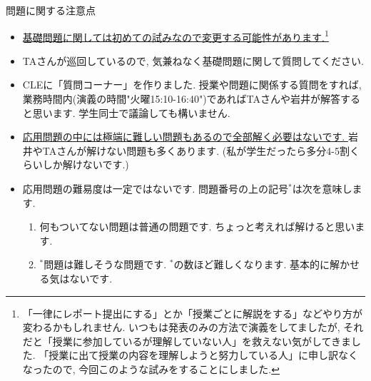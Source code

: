 \documentclass[dvipdfmx,a4paper,11pt]{article}
\theoremstyle{definition}
\begin{document}
\hspace{-18pt}問題に関する注意点
\begin{itemize}
  \setlength{\parskip}{0cm} 
  \setlength{\itemsep}{0cm} 
  \item \underline{基礎問題に関しては初めての試みなので変更する可能性があります.}\footnote{ 「一律にレポート提出にする」とか「授業ごとに解説をする」などやり方が変わるかもしれません. いつもは発表のみの方法で演義をしてましたが, それだと「授業に参加しているが理解していない人」を救えない気がしてきました. 「授業に出て授業の内容を理解しようと努力している人」に申し訳なくなったので, 今回このような試みをすることにしました. }
  \item TAさんが巡回しているので, 気兼ねなく基礎問題に関して質問してください. 
  \item CLEに「質問コーナー」を作りました. 授業や問題に関係する質問をすれば, 業務時間内(演義の時間"火曜15:10-16:40")であればTAさんや岩井が解答すると思います. 学生同士で議論しても構いません. 
\item \underline{応用問題の中には極端に難しい問題もあるので全部解く必要はないです. } 岩井やTAさんが解けない問題も多くあります. (私が学生だったら多分4-5割くらいしか解けないです.)
\item 応用問題の難易度は一定ではないです. 問題番号の上の記号$^*$は次を意味します.
\begin{enumerate}
  \setlength{\parskip}{0cm} 
  \setlength{\itemsep}{0cm} 
\item 何もついてない問題は普通の問題です. ちょっと考えれば解けると思います. %
\item $^{*}$問題は難しそうな問題です. $^*$の数ほど難しくなります.  基本的に解かせる気はないです. %
\end{enumerate}
\end{itemize}

\end{document}
